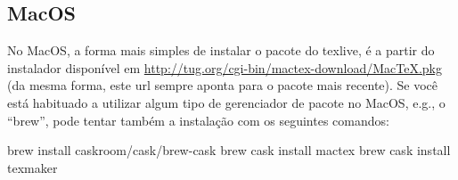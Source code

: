 \subsection*{MacOS}
\label{sec:macos}

No MacOS, a forma mais simples de instalar o pacote do texlive, é a partir do instalador disponível em \url{http://tug.org/cgi-bin/mactex-download/MacTeX.pkg} (da mesma forma, este url sempre aponta para o pacote mais recente). Se você está habituado a utilizar algum tipo de gerenciador de pacote no MacOS, e.g., o ``brew'', pode tentar também a instalação com os seguintes comandos:


\begin{commandshell}
brew install caskroom/cask/brew-cask
brew cask install mactex
brew cask install texmaker
\end{commandshell}
